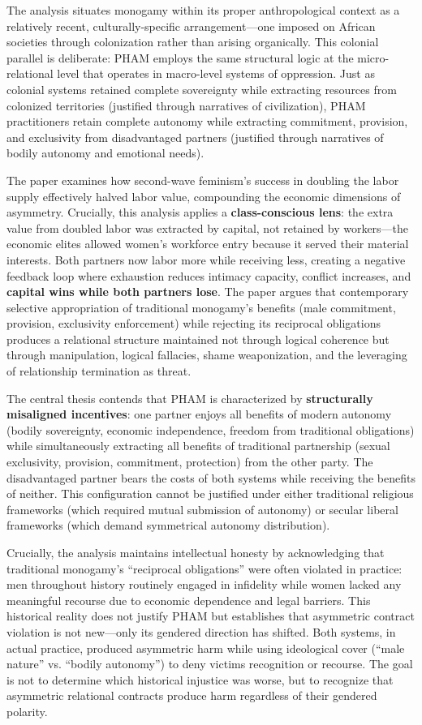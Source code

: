 \documentclass[12pt, letterpaper]{article}
\begin{document}
The analysis situates monogamy within its proper anthropological context as a relatively recent, culturally-specific arrangement---one imposed on African societies through colonization rather than arising organically. This colonial parallel is deliberate: PHAM employs the same structural logic at the micro-relational level that operates in macro-level systems of oppression. Just as colonial systems retained complete sovereignty while extracting resources from colonized territories (justified through narratives of civilization), PHAM practitioners retain complete autonomy while extracting commitment, provision, and exclusivity from disadvantaged partners (justified through narratives of bodily autonomy and emotional needs).

The paper examines how second-wave feminism's success in doubling the labor supply effectively halved labor value, compounding the economic dimensions of asymmetry. Crucially, this analysis applies a \textbf{class-conscious lens}: the extra value from doubled labor was extracted by capital, not retained by workers---the economic elites allowed women's workforce entry because it served their material interests. Both partners now labor more while receiving less, creating a negative feedback loop where exhaustion reduces intimacy capacity, conflict increases, and \textbf{capital wins while both partners lose}. The paper argues that contemporary selective appropriation of traditional monogamy's benefits (male commitment, provision, exclusivity enforcement) while rejecting its reciprocal obligations produces a relational structure maintained not through logical coherence but through manipulation, logical fallacies, shame weaponization, and the leveraging of relationship termination as threat.

The central thesis contends that PHAM is characterized by \textbf{structurally misaligned incentives}: one partner enjoys all benefits of modern autonomy (bodily sovereignty, economic independence, freedom from traditional obligations) while simultaneously extracting all benefits of traditional partnership (sexual exclusivity, provision, commitment, protection) from the other party. The disadvantaged partner bears the costs of both systems while receiving the benefits of neither. This configuration cannot be justified under either traditional religious frameworks (which required mutual submission of autonomy) or secular liberal frameworks (which demand symmetrical autonomy distribution).

Crucially, the analysis maintains intellectual honesty by acknowledging that traditional monogamy's ``reciprocal obligations'' were often violated in practice: men throughout history routinely engaged in infidelity while women lacked any meaningful recourse due to economic dependence and legal barriers. This historical reality does not justify PHAM but establishes that asymmetric contract violation is not new---only its gendered direction has shifted. Both systems, in actual practice, produced asymmetric harm while using ideological cover (``male nature'' vs. ``bodily autonomy'') to deny victims recognition or recourse. The goal is not to determine which historical injustice was worse, but to recognize that asymmetric relational contracts produce harm regardless of their gendered polarity.
\end{document}
